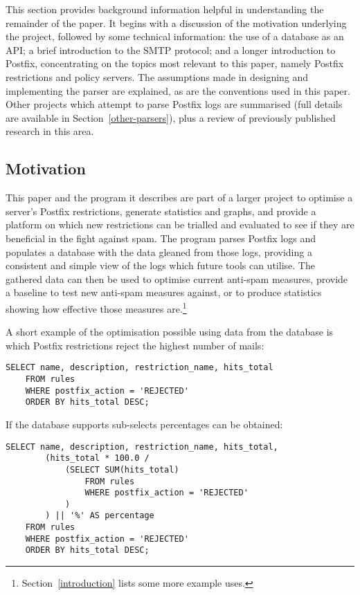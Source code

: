\documentclass[a4paper,12pt,draft]{article}
\begin{document}
This section provides background information helpful in understanding the
remainder of the paper.  It begins with a discussion of the motivation
underlying the project, followed by some technical information: the use of
a database as an API\@; a brief introduction to the SMTP protocol; and a
longer introduction to Postfix, concentrating on the topics most relevant
to this paper, namely Postfix restrictions and policy servers.  The
assumptions made in designing and implementing the parser are explained, as
are the conventions used in this paper.  Other projects which attempt to
parse Postfix logs are summarised (full details are available in
Section~\ref{other-parsers}), plus a review of previously published
research in this area.

\subsection{Motivation}

This paper and the program it describes are part of a larger project to
optimise a server's Postfix restrictions, generate statistics and graphs,
and provide a platform on which new restrictions can be trialled and
evaluated to see if they are beneficial in the fight against spam.  The
program parses Postfix logs and populates a database with the data gleaned
from those logs, providing a consistent and simple view of the logs which
future tools can utilise.  The gathered data can then be used to optimise
current anti-spam measures, provide a baseline to test new anti-spam
measures against, or to produce statistics showing how effective those
measures are.\footnote{Section~\ref{introduction} lists some more example
uses.}

A short example of the optimisation possible using data from the database
is which Postfix restrictions reject the highest number of mails:

\begin{verbatim}
SELECT name, description, restriction_name, hits_total
    FROM rules
    WHERE postfix_action = 'REJECTED'
    ORDER BY hits_total DESC;
\end{verbatim}

If the database supports sub-selects percentages can be
obtained:

\begin{verbatim}
SELECT name, description, restriction_name, hits_total,
        (hits_total * 100.0 /
            (SELECT SUM(hits_total)
                FROM rules
                WHERE postfix_action = 'REJECTED'
            )
        ) || '%' AS percentage
    FROM rules
    WHERE postfix_action = 'REJECTED'
    ORDER BY hits_total DESC;
\end{verbatim}
\end{document}
